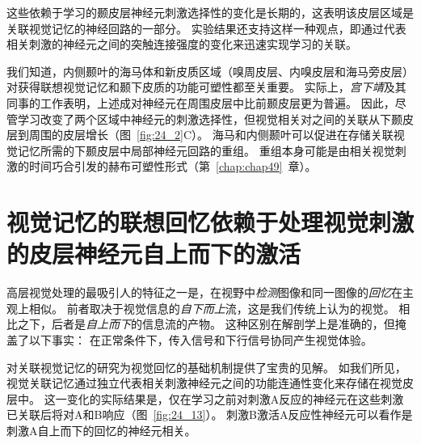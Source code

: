 这些依赖于学习的颞皮层神经元刺激选择性的变化是长期的，这表明该皮层区域是关联视觉记忆的神经回路的一部分。
实验结果还支持这样一种观点，即通过代表相关刺激的神经元之间的突触连接强度的变化来迅速实现学习的关联。


我们知道，内侧颞叶的海马体和新皮质区域（嗅周皮层、内嗅皮层和海马旁皮层）对获得联想视觉记忆和颞下皮质的功能可塑性都至关重要。
实际上，\textit{宫下靖}及其同事的工作表明，上述成对神经元在周围皮层中比前颞皮层更为普遍。
因此，尽管学习改变了两个区域中神经元的刺激选择性，但视觉相关对之间的关联从下颞皮层到周围的皮层增长（图~\ref{fig:24_2}C）。
海马和内侧颞叶可以促进在存储关联视觉记忆所需的下颞皮层中局部神经元回路的重组。
重组本身可能是由相关视觉刺激的时间巧合引发的赫布可塑性形式（第~\ref{chap:chap49}~章）。



\section{视觉记忆的联想回忆依赖于处理视觉刺激的皮层神经元自上而下的激活}

高层视觉处理的最吸引人的特征之一是，在视野中\textit{检测}图像和同一图像的\textit{回忆}在主观上相似。
前者取决于视觉信息的\textit{自下而上}流，这是我们传统上认为的视觉。
相比之下，后者是\textit{自上而下}的信息流的产物。
这种区别在解剖学上是准确的，但掩盖了以下事实：
在正常条件下，传入信号和下行信号协同产生视觉体验。


对关联视觉记忆的研究为视觉回忆的基础机制提供了宝贵的见解。
如我们所见，视觉关联记忆通过独立代表相关刺激神经元之间的功能连通性变化来存储在视觉皮层中。
这一变化的实际结果是，仅在学习之前对刺激A反应的神经元在这些刺激已关联后将对A和B响应（图~\ref{fig:24_13}）。
刺激B激活A反应性神经元可以看作是刺激A自上而下的回忆的神经元相关。


